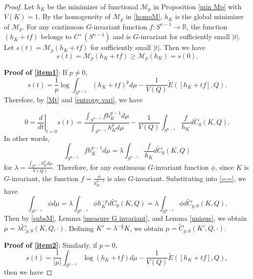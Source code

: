 \documentclass[12pt, reqno]{amsart}
\theoremstyle{definition}
\theoremstyle{remark}
\numberwithin{equation}{section}
\newcommand{\Sn}{S^{n-1}}
\begin{document}
\begin{proof}
	Let $h_{K}$ be the minimizer of functional $\mathcal{M}_{p}$ in Proposition \ref{min Mp} with $V(K)=1$.
	By the homogeneity of $\mathcal{M}_{p}$ in \eqref{homoM}, $h_K$ is the global minimizer of $\mathcal{M}_{p}$.	For any continuous $G$-invariant function $f:\Sn\rightarrow \mathbb{R}$,   the function $\left( h_{K}+tf\right) $ belongs to $C^{+}(\Sn)$ and is $G$-invariant for sufficiently small $|t|$.  Let $s(t)=\mathcal{M}_{p}(h_{K}+tf)$ for sufficiently small $|t|$. Then we have
	\begin{equation}\label{Mt}
		s(t)=\mathcal{M}_{p}(h_{K}+tf)\ge \mathcal{M}_{p}(h_{K})=s(0).
	\end{equation}
	
	\textbf{Proof of \eqref{item1}}:
	If $p\neq 0$, 
	\begin{equation*}
		s(t) = \frac{1}{p} \log \int_{S^{n-1}} (h_{K}+tf)^{p}  d\mu - \frac{1}{V(Q)}  \widetilde{E}([h_{K}+tf], Q).
	\end{equation*}
	Therefore, by \eqref{Mt} and \eqref{entropy vari}, we have
	
	\begin{equation*}
		0=\left.\frac{d}{d t}\right|_{t=0}	s(t)=\dfrac{\int_{S^{n-1}}fh_{K}^{p-1}d\mu}{\int_{S^{n-1}}h_{K}^{p}d\mu}-\frac{1}{V(Q)}\int_{S^{n-1}}\frac{f}{h_{K}}d\widetilde{C}_{0}(K,Q).
	\end{equation*}
	In other words,
	\begin{equation}\label{==}
		\int_{S^{n-1}}fh_{K}^{p-1}d\mu=\lambda \int_{S^{n-1}}\frac{f}{h_{K}}d\widetilde{C}_{0}(K,Q)
	\end{equation}
	for $\lambda=\frac{\int_{S^{n-1}}h_{K}^{p}d\mu}{V(Q)}$. Therefore, for any continuous $G$-invariant function $\phi$, since $K$ is $G$-invariant, the function $f=\frac{\phi}{h_{K}^{p-1}}$ is also $G$-invariant. Substituting into \eqref{==}, we have
	\begin{equation}\label{subsM}
		\int_{S^{n-1}}\phi d\mu=\lambda \int_{S^{n-1}}\phi h_{K}^{-p}d\widetilde{C}_{0}(K,Q)=\lambda\int_{S^{n-1}}\phi d\widetilde{C}_{p,0}(K,Q).
	\end{equation}
	Then by \eqref{subsM}, Lemma \ref{measure G invariant}, and Lemma \ref{unique}, we obtain $\mu=\lambda \widetilde{C}_{p,0}(K,Q,\cdot)$.	
	 Defining $K' = \lambda^{-\frac{1}{p}} K$, we obtain 
	$\mu= \widetilde{C}_{p,0}(K',Q,\cdot)$.	
	
	\textbf{Proof of \eqref{item2}}: Similarly, if $p=0$, 
	\begin{equation*}
		s(t) = \frac{1}{|\mu|} \int _{S^{n-1}}\log (h_{K}+tf) d\mu - \frac{1}{V(Q)}  \widetilde{E}([h_{K}+tf], Q),
	\end{equation*}
	then	 we have
	

\end{proof}
\end{document}
